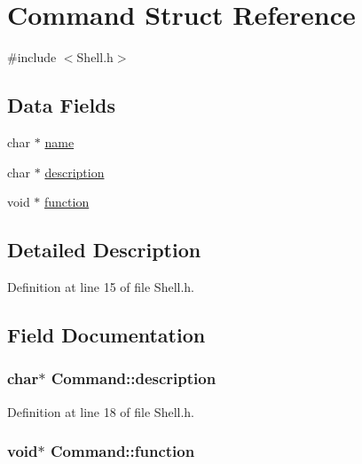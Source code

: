 \hypertarget{structCommand}{}\section{Command Struct Reference}
\label{structCommand}


{\ttfamily \#include $<$Shell.\+h$>$}

\subsection*{Data Fields}
\begin{DoxyCompactItemize}
\item 
char $\ast$ \hyperlink{structCommand_aac61810b8e87055d1648ec142086eb0e}{name}
\item 
char $\ast$ \hyperlink{structCommand_a4c2ce6d4fa23b96f04bfc5421b338f10}{description}
\item 
void $\ast$ \hyperlink{structCommand_a3012bc63b47f3e5606ee1ccafb5fb3ae}{function}
\end{DoxyCompactItemize}


\subsection{Detailed Description}


Definition at line 15 of file Shell.\+h.



\subsection{Field Documentation}
\subsubsection[{\texorpdfstring{description}{description}}]{\setlength{\rightskip}{0pt plus 5cm}char$\ast$ Command\+::description}\hypertarget{structCommand_a4c2ce6d4fa23b96f04bfc5421b338f10}{}\label{structCommand_a4c2ce6d4fa23b96f04bfc5421b338f10}


Definition at line 18 of file Shell.\+h.

\subsubsection[{\texorpdfstring{function}{function}}]{\setlength{\rightskip}{0pt plus 5cm}void$\ast$ Command\+::function}\hypertarget{structCommand_a3012bc63b47f3e5606ee1ccafb5fb3ae}{}\label{structCommand_a3012bc63b47f3e5606ee1ccafb5fb3ae}


